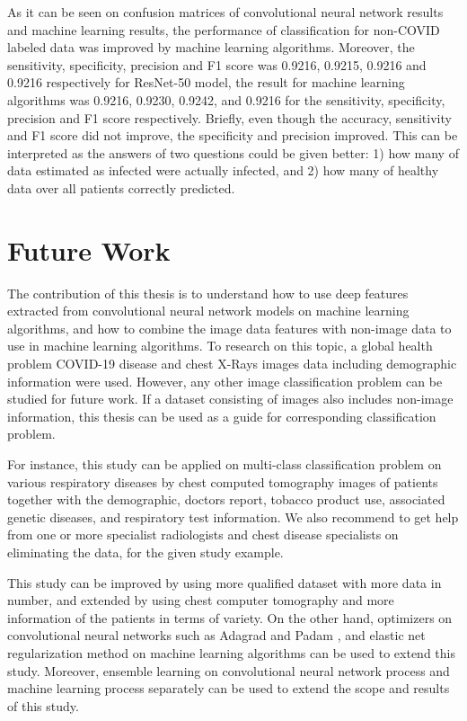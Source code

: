 As it can be seen on confusion matrices of convolutional neural network results and machine learning results, the performance of classification for non-COVID labeled data was improved by machine learning algorithms. Moreover, the sensitivity, specificity, precision and F1 score was 0.9216, 0.9215, 0.9216 and 0.9216 respectively for ResNet-50 model, the result for machine learning algorithms was 0.9216, 0.9230, 0.9242, and 0.9216 for the sensitivity, specificity, precision and F1 score respectively. Briefly, even though the accuracy, sensitivity and F1 score did not improve, the specificity and precision improved. This can be interpreted as the answers of two questions could be given better: 1) how many of data estimated as infected were actually infected, and 2) how many of healthy data over all patients correctly predicted.

\section{Future Work}

The contribution of this thesis is to understand how to use deep features extracted from convolutional neural network models on machine learning algorithms, and how to combine the image data features with non-image data to use in machine learning algorithms. To research on this topic, a global health problem COVID-19 disease and chest X-Rays images data including demographic information were used. However, any other image classification problem can be studied for future work. If a dataset consisting of images also includes non-image information, this thesis can be used as a guide for corresponding classification problem.

For instance, this study can be applied on multi-class classification problem on various respiratory diseases by chest computed tomography images of patients together with the demographic, doctors report, tobacco product use, associated genetic diseases, and respiratory test information. We also recommend to get help from one or more specialist radiologists and chest disease specialists on eliminating the data, for the given study example.

This study can be improved by using more qualified dataset with more data in number, and extended by using chest computer tomography and more information of the patients in terms of variety. On the other hand, optimizers on convolutional neural networks such as Adagrad \cite{adagrad} and Padam \cite{padam}, and elastic net regularization method \cite{elasticnet_paper} on machine learning algorithms can be used to extend this study. Moreover, ensemble learning \cite{ensemble_learning} on convolutional neural network process and machine learning process separately can be used to extend the scope and results of this study. 


